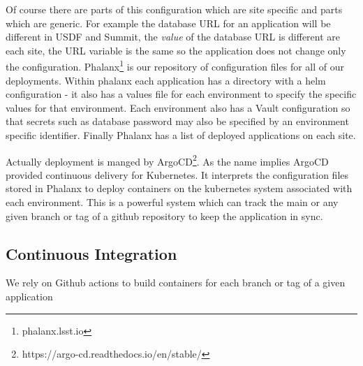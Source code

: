 Of course there are parts of this configuration which are site specific and parts which are generic.
For example the database URL for an application will be different in USDF and Summit, the \emph{value} of the database URL is different are each site, the URL variable is the same so the application does not change only the configuration.
Phalanx\footnote{phalanx.lsst.io} is our repository of configuration files for all of our deployments.
Within phalanx each application has a directory with a helm configuration - it also has a values file for each environment to specify the specific values for that environment.
Each environment also has a Vault configuration so that secrets such as database password may also be specified by an environment specific identifier.
Finally Phalanx has a list of deployed applications on each site.

Actually deployment is manged by ArgoCD\footnote{https://argo-cd.readthedocs.io/en/stable/}.
As the name implies ArgoCD provided continuous delivery for Kubernetes.
It interprets the configuration files stored in Phalanx to deploy containers on the kubernetes system associated with each environment.
This is a powerful system which can track the main or any given branch or tag of a github repository to keep the application in sync.

\subsection{Continuous Integration}
We rely on Github actions to build containers for each branch or tag of a given application

